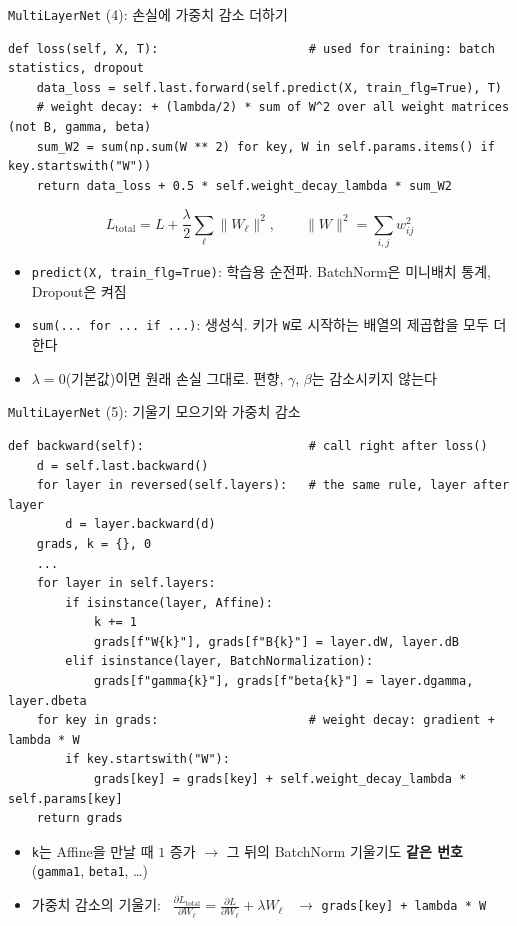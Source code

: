 \documentclass[aspectratio=169,11pt]{beamer}
\newcommand{\codesmall}{\ttfamily\fontsize{7.4}{8.3}\selectfont}
\newcommand{\pd}[2]{\frac{\partial #1}{\partial #2}}
\newcommand{\code}[1]{\texttt{#1}}
\begin{document}
\begin{frame}[fragile]{\code{MultiLayerNet} (4): 손실에 가중치 감소 더하기}
\begin{lstlisting}
def loss(self, X, T):                     # used for training: batch statistics, dropout
    data_loss = self.last.forward(self.predict(X, train_flg=True), T)
    # weight decay: + (lambda/2) * sum of W^2 over all weight matrices (not B, gamma, beta)
    sum_W2 = sum(np.sum(W ** 2) for key, W in self.params.items() if key.startswith("W"))
    return data_loss + 0.5 * self.weight_decay_lambda * sum_W2
\end{lstlisting}
\[
L_{\text{total}} = L + \frac{\lambda}{2}\sum_{\ell}\|W_\ell\|^2,
\qquad \|W\|^2=\sum_{i,j} w_{ij}^2
\]
\begin{itemize}
\item \code{predict(X, train\_flg=True)}: 학습용 순전파. BatchNorm은 미니배치 통계, Dropout은 켜짐
\item \code{sum(... for ... if ...)}: 생성식. 키가 \code{W}로 시작하는 배열의 제곱합을 모두 더한다
\item $\lambda=0$(기본값)이면 원래 손실 그대로. 편향, $\gamma$, $\beta$는 감소시키지 않는다
\end{itemize}
\end{frame}

\begin{frame}[fragile]{\code{MultiLayerNet} (5): 기울기 모으기와 가중치 감소}
\begin{lstlisting}[basicstyle=\codesmall]
def backward(self):                       # call right after loss()
    d = self.last.backward()
    for layer in reversed(self.layers):   # the same rule, layer after layer
        d = layer.backward(d)
    grads, k = {}, 0
    ...
    for layer in self.layers:
        if isinstance(layer, Affine):
            k += 1
            grads[f"W{k}"], grads[f"B{k}"] = layer.dW, layer.dB
        elif isinstance(layer, BatchNormalization):
            grads[f"gamma{k}"], grads[f"beta{k}"] = layer.dgamma, layer.dbeta
    for key in grads:                     # weight decay: gradient + lambda * W
        if key.startswith("W"):
            grads[key] = grads[key] + self.weight_decay_lambda * self.params[key]
    return grads
\end{lstlisting}
\small
\begin{itemize}
\item \code{k}는 Affine을 만날 때 $1$ 증가 $\to$ 그 뒤의 BatchNorm 기울기도 \textbf{같은 번호} (\code{gamma1}, \code{beta1}, \ldots)
\item 가중치 감소의 기울기: \
$\displaystyle \pd{L_{\text{total}}}{W_\ell} = \pd{L}{W_\ell} + \lambda W_\ell$ \ $\to$ \code{grads[key] + lambda * W}
\end{itemize}
\end{frame}
\end{document}
